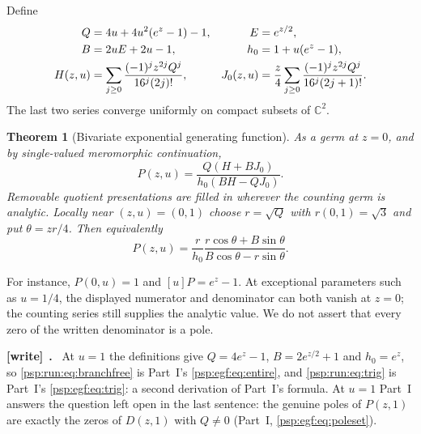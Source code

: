 \documentclass[11pt,letterpaper]{article}
\numberwithin{equation}{section}
\newtheorem{theorem}{Theorem}[section]
\theoremstyle{remark}\newtheorem{remark}[theorem]{Remark}
\newcommand{\CC}{\mathbb C}
\newenvironment{writenote}[1][]{\par\smallskip\begingroup\small
 \noindent\textbf{[write]}\if\relax\detokenize{#1}\relax\else~\textbf{#1.}\fi\ }%
 {\par\endgroup\smallskip}
\begin{document}
Define
\begin{align}
 Q&=4u+4u^2(e^z-1)-1,& E&=e^{z/2},\notag\\
 B&=2uE+2u-1,& h_0&=1+u(e^z-1),\label{psp:run:eq:definitions}\\
 H(z,u)&=\sum_{j\geq0}\frac{(-1)^jz^{2j}Q^j}{16^j(2j)!},&
 J_0(z,u)&=\frac z4\sum_{j\geq0}\frac{(-1)^jz^{2j}Q^j}{16^j(2j+1)!}.
 \label{psp:run:eq:entireHJ}
\end{align}
The last two series converge uniformly on compact subsets of $\CC^2$.
\begin{theorem}[Bivariate exponential generating function]\label{psp:run:thm:egf}
As a germ at $z=0$, and by single-valued meromorphic continuation,
\begin{equation}\label{psp:run:eq:branchfree}
 \boxed{P(z,u)=\frac{Q(H+BJ_0)}{h_0(BH-QJ_0)}}.
\end{equation}
Removable quotient presentations are filled in wherever the counting
germ is analytic. Locally near $(z,u)=(0,1)$ choose $r=\sqrt Q$ with
$r(0,1)=\sqrt3$ and put $\theta=zr/4$. Then equivalently
\begin{equation}\label{psp:run:eq:trig}
 P(z,u)=\frac r{h_0}
 \frac{r\cos\theta+B\sin\theta}{B\cos\theta-r\sin\theta}.
\end{equation}
\end{theorem}
For instance, $P(0,u)=1$ and $[u]P=e^z-1$. At exceptional parameters such
as $u=1/4$, the displayed numerator and denominator can both vanish at
$z=0$; the counting series still supplies the analytic value. We do not
assert that every zero of the written denominator is a pole.
\begin{writenote}
At $u=1$ the definitions give $Q=4e^z-1$, $B=2e^{z/2}+1$ and $h_0=e^z$, so \eqref{psp:run:eq:branchfree} is Part~I's \eqref{psp:egf:eq:entire}, and \eqref{psp:run:eq:trig} is Part~I's \eqref{psp:egf:eq:trig}: a second derivation of Part~I's formula. At $u=1$ Part~I answers the question left open in the last sentence: the genuine poles of $P(z,1)$ are exactly the zeros of $D(z,1)$ with $Q\ne0$ (Part~I, \eqref{psp:egf:eq:poleset}).
\end{writenote}
\end{document}
